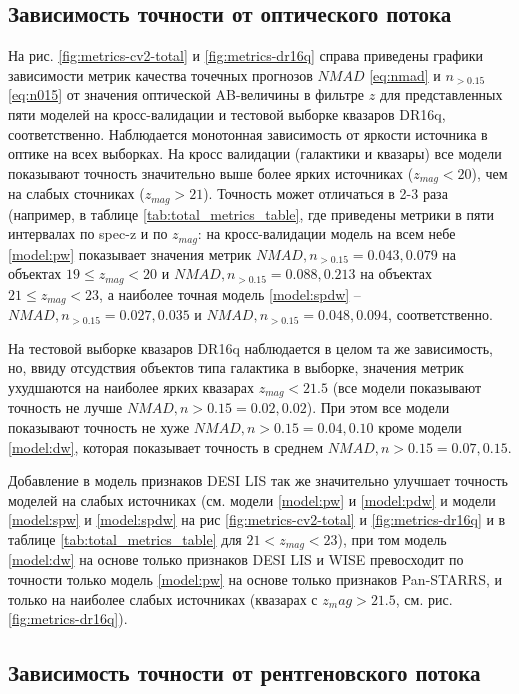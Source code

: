 \documentclass[fleqn,usenatbib]{mnras}
\begin{document}
\subsection{Зависимость точности от оптического потока}\label{ssec:accuracy-as-fzmag}
На рис. \ref{fig:metrics-cv2-total} и \ref{fig:metrics-dr16q} справа приведены графики зависимости метрик качества точечных прогнозов $NMAD$ \eqref{eq:nmad} и $n_{>0.15}$ \eqref{eq:n015} от значения оптической AB-величины в фильтре $z$ для представленных пяти моделей на кросс-валидации и тестовой выборке квазаров DR16q, соответственно. Наблюдается монотонная зависимость от яркости источника в оптике на всех выборках. На кросс валидации (галактики и квазары) все модели показывают точность значительно выше более ярких источниках ($z_{mag} < 20$), чем на слабых сточниках ($z_{mag} > 21$). Точность может отличаться в 2-3 раза (например, в таблице \ref{tab:total_metrics_table}, где приведены метрики в пяти интервалах по spec-z и по $z_{mag}$: на кросс-валидации модель на всем небе \ref{model:pw} показывает значения метрик $NMAD, n_{>0.15} = 0.043, 0.079$ на объектах $19 \leq z_{mag} < 20$ и $NMAD, n_{>0.15} = 0.088, 0.213$ на объектах $21 \leq z_{mag} < 23$, а наиболее точная модель \ref{model:spdw} -- $NMAD, n_{>0.15} = 0.027, 0.035$ и $NMAD, n_{>0.15} = 0.048, 0.094$, соответственно.

На тестовой выборке квазаров DR16q наблюдается в целом та же зависимость, но, ввиду отсудствия объектов типа галактика в выборке, значения метрик ухудшаются на наиболее ярких квазарах $z_{mag} < 21.5$ (все модели показывают точность не лучше $NMAD, n>0.15 = 0.02, 0.02$). При этом все модели показывают точность не хуже $NMAD, n>0.15 = 0.04, 0.10$ кроме модели \ref{model:dw}, которая показывает точность в среднем $NMAD, n>0.15 = 0.07, 0.15$.

Добавление в модель признаков DESI LIS так же значительно улучшает точность моделей на слабых источниках (см. модели \ref{model:pw} и \ref{model:pdw} и модели \ref{model:spw} и \ref{model:spdw} на рис \ref{fig:metrics-cv2-total} и \ref{fig:metrics-dr16q} и в таблице \ref{tab:total_metrics_table} для $21 < z_{mag} < 23$), при том модель \ref{model:dw} на основе только признаков DESI LIS и WISE превосходит по точности только модель \ref{model:pw} на основе только признаков Pan-STARRS, и только на наиболее слабых источниках (квазарах с $z_mag > 21.5$, см. рис. \ref{fig:metrics-dr16q}).

\subsection{Зависимость точности от рентгеновского потока}\label{ssec:accuracy-as-ffx}
\end{document}
